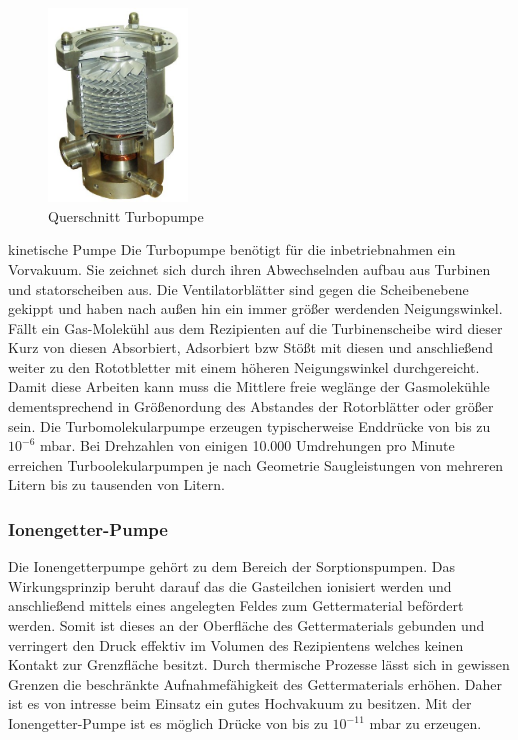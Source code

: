 \begin{figure}
    \vspace{-1cm}
    \centering
    \includegraphics[width=0.33\textwidth]{./picture/Turbo.jpg}
    \caption{Querschnitt Turbopumpe \cite{Turbo}}
    \label{fig:Turbo}
    \vspace{-0.5cm}
\end{figure}
kinetische Pumpe \newline
Die Turbopumpe benötigt für die inbetriebnahmen ein Vorvakuum. Sie zeichnet sich durch ihren Abwechselnden aufbau aus Turbinen und statorscheiben aus. Die Ventilatorblätter sind gegen die Scheibenebene gekippt und haben nach außen hin ein immer größer werdenden Neigungswinkel. Fällt ein Gas-Molekühl aus dem Rezipienten auf die Turbinenscheibe wird dieser Kurz von diesen Absorbiert, Adsorbiert bzw Stößt mit diesen und anschließend weiter zu den Rototbletter mit einem höheren Neigungswinkel durchgereicht. Damit diese Arbeiten kann muss die Mittlere freie weglänge der Gasmolekühle dementsprechend in Größenordung des Abstandes der Rotorblätter oder größer sein. Die Turbomolekularpumpe erzeugen typischerweise Enddrücke von bis zu $10^{-6}$ mbar. Bei Drehzahlen von einigen 10.000 Umdrehungen pro Minute erreichen Turboolekularpumpen je nach Geometrie Saugleistungen von mehreren Litern bis zu tausenden von Litern.

\subsubsection{Ionengetter-Pumpe}
Die Ionengetterpumpe gehört zu dem Bereich der Sorptionspumpen. Das Wirkungsprinzip beruht darauf das die Gasteilchen ionisiert werden und anschließend mittels eines angelegten Feldes zum Gettermaterial befördert werden. Somit ist dieses an der Oberfläche des Gettermaterials gebunden und verringert den Druck effektiv im Volumen des Rezipientens welches keinen Kontakt zur Grenzfläche besitzt. Durch thermische Prozesse lässt sich in gewissen Grenzen die beschränkte Aufnahmefähigkeit des Gettermaterials erhöhen. Daher ist es von intresse beim Einsatz ein gutes Hochvakuum zu besitzen. Mit der Ionengetter-Pumpe ist es möglich Drücke von bis zu $10^{-11}$ mbar zu erzeugen.

